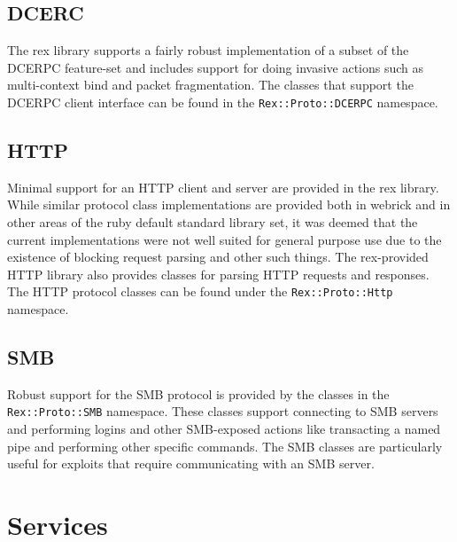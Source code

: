\documentclass{report}
\begin{document}
        \subsection{DCERC}

\par
The rex library supports a fairly robust implementation of a subset
of the DCERPC feature-set and includes support for doing invasive
actions such as multi-context bind and packet fragmentation.  The
classes that support the DCERPC client interface can be found in the
\texttt{Rex::Proto::DCERPC} namespace.

        \subsection{HTTP}

\par
Minimal support for an HTTP client and server are provided in the
rex library.  While similar protocol class implementations are
provided both in webrick and in other areas of the ruby default
standard library set, it was deemed that the current implementations
were not well suited for general purpose use due to the existence of
blocking request parsing and other such things.  The rex-provided
HTTP library also provides classes for parsing HTTP requests and
responses.  The HTTP protocol classes can be found under the
\texttt{Rex::Proto::Http} namespace.

        \subsection{SMB}

\par
Robust support for the SMB protocol is provided by the classes in
the \texttt{Rex::Proto::SMB} namespace.  These classes support
connecting to SMB servers and performing logins and other
SMB-exposed actions like transacting a named pipe and performing
other specific commands.  The SMB classes are particularly useful
for exploits that require communicating with an SMB server.

    \section{Services}
\end{document}
